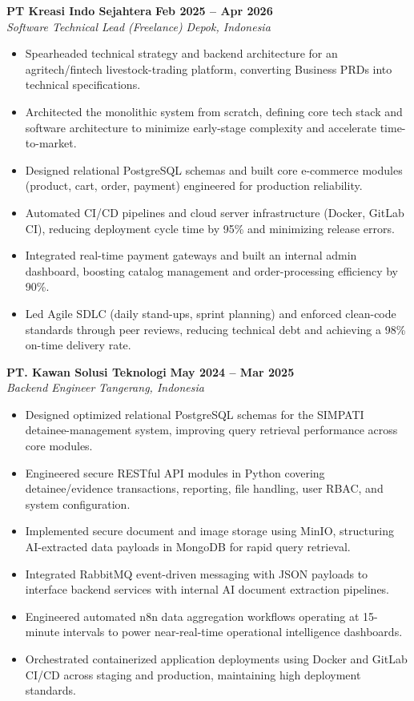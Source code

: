 \documentclass[10pt, letterpaper]{article}
\newcommand{\jobheader}[4]{%
  \noindent\textbf{#1} \hfill \textbf{#2}\\[1pt]
  \textit{#3} \hfill \textit{#4}\\[1.5pt]
}
\begin{document}
\jobheader{PT Kreasi Indo Sejahtera}{Feb 2025 -- Apr 2026}{Software Technical Lead (Freelance)}{Depok, Indonesia}
\begin{itemize}
  \item Spearheaded technical strategy and backend architecture for an agritech/fintech livestock-trading platform, converting Business PRDs into technical specifications.
  \item Architected the monolithic system from scratch, defining core tech stack and software architecture to minimize early-stage complexity and accelerate time-to-market.
  \item Designed relational PostgreSQL schemas and built core e-commerce modules (product, cart, order, payment) engineered for production reliability.
  \item Automated CI/CD pipelines and cloud server infrastructure (Docker, GitLab CI), reducing deployment cycle time by 95\% and minimizing release errors.
  \item Integrated real-time payment gateways and built an internal admin dashboard, boosting catalog management and order-processing efficiency by 90\%.
  \item Led Agile SDLC (daily stand-ups, sprint planning) and enforced clean-code standards through peer reviews, reducing technical debt and achieving a 98\% on-time delivery rate.
\end{itemize}
\vspace{2pt}

\jobheader{PT. Kawan Solusi Teknologi}{May 2024 -- Mar 2025}{Backend Engineer}{Tangerang, Indonesia}
\begin{itemize}
  \item Designed optimized relational PostgreSQL schemas for the SIMPATI detainee-management system, improving query retrieval performance across core modules.
  \item Engineered secure RESTful API modules in Python covering detainee/evidence transactions, reporting, file handling, user RBAC, and system configuration.
  \item Implemented secure document and image storage using MinIO, structuring AI-extracted data payloads in MongoDB for rapid query retrieval.
  \item Integrated RabbitMQ event-driven messaging with JSON payloads to interface backend services with internal AI document extraction pipelines.
  \item Engineered automated n8n data aggregation workflows operating at 15-minute intervals to power near-real-time operational intelligence dashboards.
  \item Orchestrated containerized application deployments using Docker and GitLab CI/CD across staging and production, maintaining high deployment standards.
\end{itemize}
\vspace{2pt}
\end{document}
